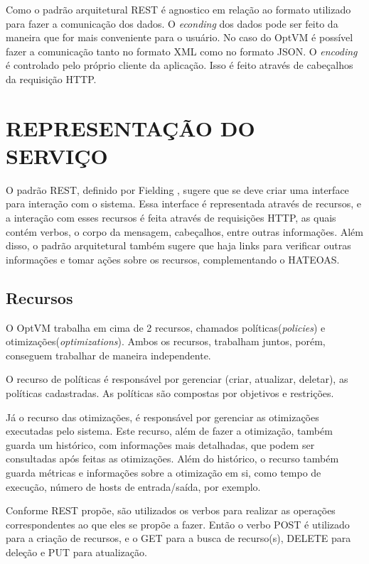 Como o padrão arquitetural REST é agnostico em relação ao formato utilizado para fazer a comunicação dos dados. O \textit{econding} 
dos dados pode ser feito da maneira que for mais conveniente para o usuário. No caso do OptVM é possível fazer a comunicação
tanto no formato XML como no formato JSON. O \textit{encoding}
é controlado pelo próprio cliente da aplicação. 
Isso é feito através de cabeçalhos da requisição HTTP.

\section{REPRESENTAÇÃO DO SERVIÇO}

O padrão REST, definido por Fielding \cite{fielding}, sugere que se deve criar uma interface para interação com o sistema. 
Essa interface é representada através de recursos, e a interação com esses recursos é feita através de requisições HTTP, 
as quais contém verbos, o corpo da mensagem, cabeçalhos, entre outras informações. Além disso, o padrão arquitetural também sugere que 
haja links para verificar outras informações e tomar ações sobre os recursos, complementando o HATEOAS.

\subsection{Recursos}

O OptVM trabalha em cima de 2 recursos, chamados políticas(\textit{policies}) e otimizações(\textit{optimizations}). 
Ambos os recursos, trabalham juntos, porém, conseguem trabalhar de maneira independente.

O recurso de políticas é responsável por gerenciar (criar, atualizar, deletar), as políticas
cadastradas. As políticas são compostas por objetivos e restrições. 

Já o recurso das otimizações, é responsável por gerenciar as otimizações executadas pelo sistema. Este recurso,
além de fazer a otimização, também guarda um histórico, com informações mais detalhadas, 
que podem ser consultadas após feitas as otimizações. Além do histórico, o recurso também guarda métricas e informações sobre
a otimização em si, como tempo de execução, número de hosts de entrada/saída, por exemplo.

Conforme REST propõe, são utilizados os verbos para realizar as operações correspondentes
ao que eles se propõe a fazer. Então o verbo POST é utilizado para a criação de recursos,
e o GET para a busca de recurso(s), DELETE para deleção e PUT para atualização.

